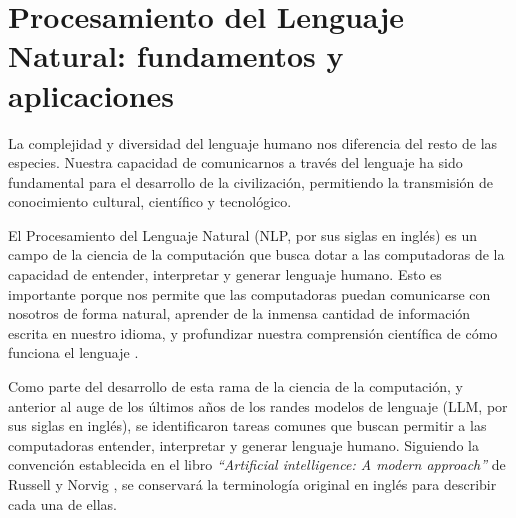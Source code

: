 \section{Procesamiento del Lenguaje Natural: fundamentos y aplicaciones}
La complejidad y diversidad del lenguaje humano nos diferencia del resto de las 
especies. Nuestra capacidad de comunicarnos a través del lenguaje ha sido 
fundamental para el desarrollo de la civilización, permitiendo la transmisión de 
conocimiento cultural, científico y tecnológico.

El Procesamiento del Lenguaje Natural (NLP, por sus siglas en inglés) es un campo 
de la ciencia de la computación que busca dotar a las computadoras 
de la capacidad de entender, interpretar y generar lenguaje humano. 
Esto es importante porque nos permite que las computadoras puedan comunicarse con 
nosotros de forma natural, aprender de la inmensa cantidad de información escrita 
en nuestro idioma, y profundizar nuestra comprensión científica de cómo funciona 
el lenguaje \cite{Russell2020}.

Como parte del desarrollo de esta rama de la ciencia de la computación, y anterior 
al auge de los últimos años de los randes modelos de lenguaje (LLM, por sus siglas en inglés), 
se identificaron tareas comunes que buscan permitir a las computadoras entender, 
interpretar y generar lenguaje humano. Siguiendo la convención establecida en 
el libro \textit{``Artificial intelligence: A modern approach''} de Russell y Norvig \cite{Russell2020}, 
se conservará la terminología original en inglés para describir cada una de ellas.

